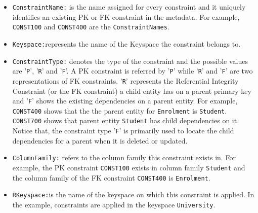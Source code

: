 \begin{itemize}
  
  \item \texttt{ConstraintName:} is the name assigned for
  every constraint and it uniquely identifies an
  existing \ac{PK} or \ac{FK} constraint in the metadata. 
   For example,  \texttt{CONST100} and \texttt{CONST400} are the
  \texttt{ConstraintNames}.
  
  \item \texttt{Keyspace:}represents the name of the Keyspace the constraint
  belongs to. 
  
  \item \texttt{ConstraintType:} denotes the type of the constraint and the
  possible values are '\texttt{P}', '\texttt{R}' and '\texttt{F}'.
	A \ac{PK} constraint is referred by '\texttt{P}' while '\texttt{R}' and
	'\texttt{F}' are two representations of \ac{FK} constraints.
		'\texttt{R}' represents the Referential Integrity
	Constraint (or the \ac{FK} constraint) a child entity has on a parent primary
	key and '\texttt{F}' shows the  existing dependencies on a parent
	entity.
	For example, \texttt{CONST400} shows that the the parent entity
	 for \texttt{Enrolment} is \texttt{Student}. \texttt{CONST700}
	shows that parent entity \texttt{Student} has child dependencies on it. Notice
	that, the constraint type '\texttt{F}'
	is primarily used to locate the child dependencies for a parent when it
	is deleted or updated.

   
  \item \texttt{ColumnFamily:} refers to the column family this constraint
  exists in. For example,  the \ac{PK} constraint
  \texttt{CONST100}  exists in column family \texttt{Student} and the column
  family of the \ac{FK} constraint \texttt{CONST400}
  is \texttt{Enrolment}.
  
  \item \texttt{RKeyspace:}is the name of the keyspace on which this constraint
  is applied.  In the example, constraints  are applied in  the keyspace
  \texttt{University}.
  

\end{itemize}
